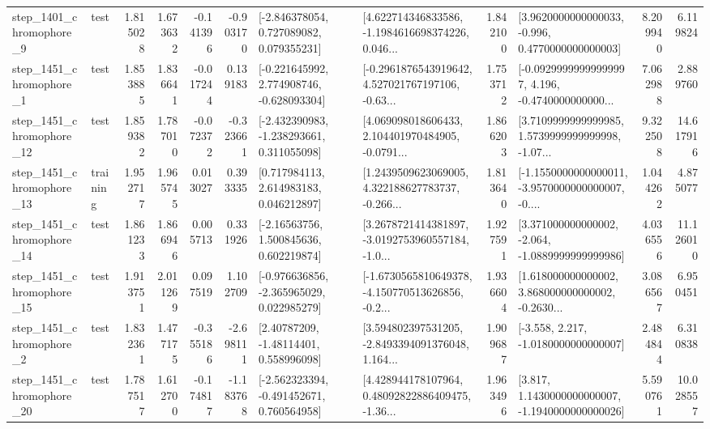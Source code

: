 \begin{tabular}{llrrrrllrlrr}
  step\_1401\_chromophore\_9 &      test &      1.815028 &    1.673632 &     -0.141396 & -0.903170 &    [-2.846378054, 0.727089082, 0.079355231] &  [4.622714346833586, -1.1984616698374226, 0.046... &       1.842100 &   [3.9620000000000033, -0.996, 0.4770000000000003] &            8.209940 &          6.119824 \\
  step\_1451\_chromophore\_1 &      test &      1.853885 &    1.836641 &     -0.017244 &  0.139183 &   [-0.221645992, 2.774908746, -0.628093304] &  [-0.2961876543919642, 4.527021767197106, -0.63... &       1.753712 &  [-0.09299999999999997, 4.196, -0.4740000000000... &            7.062988 &          2.889760 \\
 step\_1451\_chromophore\_12 &      test &      1.859382 &    1.787010 &     -0.072372 & -0.323661 &   [-2.432390983, -1.238293661, 0.311055098] &  [4.069098018606433, 2.104401970484905, -0.0791... &       1.866203 &  [3.7109999999999985, 1.5739999999999998, -1.07... &            9.322508 &         14.617916 \\
 step\_1451\_chromophore\_13 &  training &      1.952717 &    1.965745 &      0.013027 &  0.393335 &     [0.717984113, 2.614983183, 0.046212897] &  [1.2439509623069005, 4.322188627783737, -0.266... &       1.813640 &  [-1.1550000000000011, -3.9570000000000007, -0.... &            1.044262 &          4.875077 \\
 step\_1451\_chromophore\_14 &      test &      1.861233 &    1.866946 &      0.005713 &  0.331926 &     [-2.16563756, 1.500845636, 0.602219874] &  [3.2678721414381897, -3.0192753960557184, -1.0... &       1.927591 &   [3.371000000000002, -2.064, -1.0889999999999986] &            4.036556 &         11.126010 \\
 step\_1451\_chromophore\_15 &      test &      1.913751 &    2.011269 &      0.097519 &  1.102709 &   [-0.976636856, -2.365965029, 0.022985279] &  [-1.6730565810649378, -4.150770513626856, -0.2... &       1.936604 &  [1.618000000000002, 3.868000000000002, -0.2630... &            3.086567 &          6.950451 \\
  step\_1451\_chromophore\_2 &      test &      1.832361 &    1.477175 &     -0.355186 & -2.698111 &      [2.40787209, -1.48114401, 0.558996098] &  [3.594802397531205, -2.8493394091376048, 1.164... &       1.909687 &               [-3.558, 2.217, -1.0180000000000007] &            2.484844 &          6.310838 \\
 step\_1451\_chromophore\_20 &      test &      1.787517 &    1.612700 &     -0.174817 & -1.183768 &   [-2.562323394, -0.491452671, 0.760564958] &  [4.428944178107964, 0.48092822886409475, -1.36... &       1.963496 &   [3.817, 1.1430000000000007, -1.1940000000000026] &            5.590761 &         10.028557 \\

\end{tabular}
